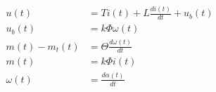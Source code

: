 \begin{gather}
\begin{align*} 
\label{eq:dc_dt}
u(t) &= Ti(t) + L\frac{di(t)}{dt} + u_b(t) \\ 
u_b(t) &= k\Phi{}\omega{}(t) \\
m(t) - m_t(t) &= \Theta{}\frac{d\omega{}(t)}{dt} \\
m(t) &= k\Phi{}i(t) \\
\omega{}(t) &= \frac{d\alpha(t)}{dt}
\end{align*}
\end{gather}